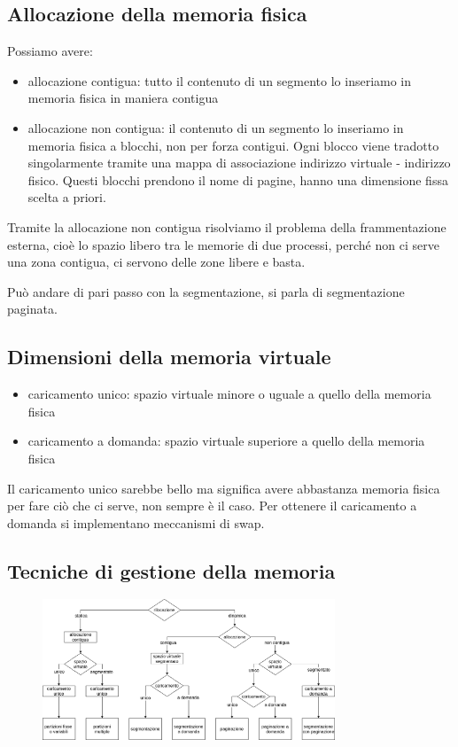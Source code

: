 \subsection{Allocazione della memoria fisica}
Possiamo avere:
\begin{itemize}
    \item allocazione contigua: tutto il contenuto di un segmento lo inseriamo in memoria fisica in maniera contigua
    \item allocazione non contigua: il contenuto di un segmento lo inseriamo in memoria fisica a blocchi, non per forza contigui.
    Ogni blocco viene tradotto singolarmente tramite una mappa di associazione indirizzo virtuale - indirizzo fisico.
    Questi blocchi prendono il nome di pagine, hanno una dimensione fissa scelta a priori.
\end{itemize}
Tramite la allocazione non contigua risolviamo il problema della frammentazione esterna, cioè lo spazio libero tra le memorie di due processi, perché non ci serve una zona contigua, ci servono delle zone libere e basta.

Può andare di pari passo con la segmentazione, si parla di segmentazione paginata.

\subsection{Dimensioni della memoria virtuale}
\begin{itemize}
    \item caricamento unico: spazio virtuale minore o uguale a quello della memoria fisica
    
    \item caricamento a domanda: spazio virtuale superiore a quello della memoria fisica
\end{itemize}
Il caricamento unico sarebbe bello ma significa avere abbastanza memoria fisica per fare ciò che ci serve, non sempre è il caso.
Per ottenere il caricamento a domanda si implementano meccanismi di swap.

\subsection{Tecniche di gestione della memoria}
\begin{figure}[H]
    \centering
    \includegraphics[width=330px]{images/9_Gestione_della_memoria/gestione_della_memoria.png}
\end{figure}


